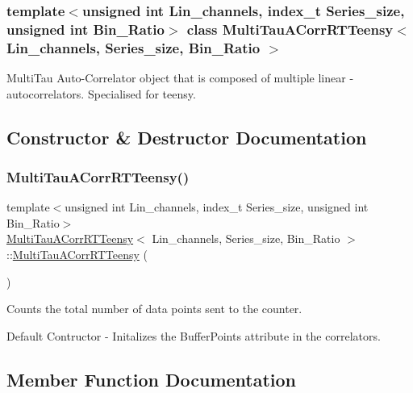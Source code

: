 \subsubsection*{template$<$unsigned int Lin\+\_\+channels, index\+\_\+t Series\+\_\+size, unsigned int Bin\+\_\+\+Ratio$>$\newline
class Multi\+Tau\+A\+Corr\+R\+T\+Teensy$<$ Lin\+\_\+channels, Series\+\_\+size, Bin\+\_\+\+Ratio $>$}

Multi\+Tau Auto-\/\+Correlator object that is composed of multiple linear -\/ autocorrelators. Specialised for teensy. 

\subsection{Constructor \& Destructor Documentation}
\mbox{\label{classMultiTauACorrRTTeensy_a46b73c98f07f536603a8f5b2b3174d91}} 
\subsubsection{\texorpdfstring{Multi\+Tau\+A\+Corr\+R\+T\+Teensy()}{MultiTauACorrRTTeensy()}}
{\footnotesize\ttfamily template$<$unsigned int Lin\+\_\+channels, index\+\_\+t Series\+\_\+size, unsigned int Bin\+\_\+\+Ratio$>$ \\
\hyperlink{classMultiTauACorrRTTeensy}{Multi\+Tau\+A\+Corr\+R\+T\+Teensy}$<$ Lin\+\_\+channels, Series\+\_\+size, Bin\+\_\+\+Ratio $>$\+::\hyperlink{classMultiTauACorrRTTeensy}{Multi\+Tau\+A\+Corr\+R\+T\+Teensy} (\begin{DoxyParamCaption}{ }\end{DoxyParamCaption})\hspace{0.3cm}{\ttfamily [inline]}}



Counts the total number of data points sent to the counter. 

Default Contructor -\/ Initalizes the Buffer\+Points attribute in the correlators. 

\subsection{Member Function Documentation}
\mbox{\label{classMultiTauACorrRTTeensy_af9ab6f055c1efc4a28c7c5bfa3aea074}} 
